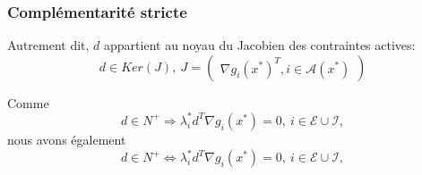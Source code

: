 \documentclass[usepdftitle=false]{beamer}
\def\cA{\mathcal{A}}
\def\cE{\mathcal{E}}
\def\cI{\mathcal{I}}
\begin{document}
\begin{frame}
\frametitle{Complémentarité stricte}

Autrement dit, $d$ appartient au noyau du Jacobien des contraintes actives:
$$
d \in Ker(J),\ J = \begin{pmatrix} \nabla g_i(x^*)^T, i \in \cA(x^*) \end{pmatrix}
$$

\mbox{}

Comme
$$
d \in N^+
\Rightarrow
\lambda_i^* d^T \nabla g_i(x^*) = 0,\ i \in \cE \cup \cI,
$$
nous avons également
$$
d \in N^+
\Leftrightarrow
\lambda_i^* d^T \nabla g_i(x^*) = 0,\ i \in \cE \cup \cI,
$$

\end{frame}
\end{document}

